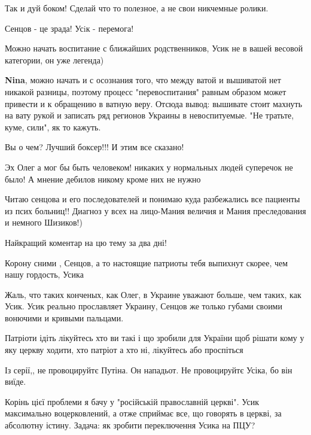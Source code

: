 \begin{itemize}
Так и дуй боком! Сделай что то полезное, а не свои никчемные ролики.

Сенцов - це зрада!
Усiк - перемога!

Можно начать воспитание с ближайших родственников, Усик не в вашей весовой категории, он уже легенда)

\begin{itemize} %
\textbf{Nina}, можно начать и с осознания того, что между ватой и вышиватой нет никакой разницы, поэтому процесс "перевоспитания" равным образом может привести и к обращению в ватную веру.
Отсюда вывод: вышивате стоит махнуть на вату рукой и записать ряд регионов Украины в невоспитуемые. "Не тратьте, куме, сили", як то кажуть.
\end{itemize} %

Вы о чем? Лучший боксер!!! И этим все сказано!

Эх Олег а мог бы быть человеком! никаких у нормальных людей суперечок не было! А мнение дебилов никому кроме них не нужно


Читаю сенцова и его последователей и понимаю куда разбежались все пациенты из
псих больниц!! Диагноз у всех на лицо-Мания величия и Мания преследования и
немного Шизиков!)


Найкращий коментар на цю тему за два дні!

Корону сними , Сенцов, а то настоящие патриоты тебя выпихнут скорее, чем нашу гордость, Усика


Жаль, что таких конченых, как Олег, в Украине уважают больше, чем таких, как
Усик. Усик реально прославляет Украину, Сенцов же только губами своими вонючими
и кривыми пальцами.



Патріоти ідіть лікуйтесь хто ви такі і що зробили для України щоб рішати кому у
яку церкву ходити, хто патріот а хто ні, лікуйтесь або проспіться


Із серії,, не провоцируйтє Путіна. Он нападьот. Не провоцируйтє Усіка, бо він виїде.

Корінь цієї проблеми я бачу у "російській православній церкві".
Усик максимально воцерковлений, а отже сприймає все, що говорять в церкві, за абсолютну істину.
Задача: як зробити переключення Усика на ПЦУ?


\end{itemize}

